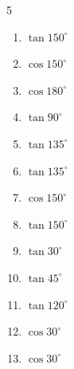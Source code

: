 \begin{multicols}{5}
\begin{enumerate}
  \item $\displaystyle \tan{150^\circ}$


  \item $\displaystyle \cos{150^\circ}$


  \item $\displaystyle \cos{180^\circ}$

        \phantom{$\displaystyle =-1$}

  \item $\displaystyle \tan{90^\circ}$

        \phantom{$\displaystyle なし$}

  \item $\displaystyle \tan{135^\circ}$

        \phantom{$\displaystyle =-1$}

\columnbreak %

  \item $\displaystyle \tan{135^\circ}$

        \phantom{$\displaystyle =-1$}

  \item $\displaystyle \cos{150^\circ}$


  \item $\displaystyle \tan{150^\circ}$


  \item $\displaystyle \tan{30^\circ}$


  \item $\displaystyle \tan{45^\circ}$

        \phantom{$\displaystyle =1$}

  \item $\displaystyle \tan{120^\circ}$


  \item $\displaystyle \cos{30^\circ}$


  \item $\displaystyle \cos{30^\circ}$


\end{enumerate}
\end{multicols}

